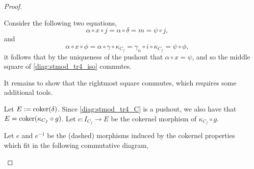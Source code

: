 \begin{proof}
\begin{enumerate}[label={(\bfseries TR\arabic*)}]
{\begin{center}
            \end{center}
            Consider the following two equations,
            \[
                \alpha \circ x \circ j = \alpha \circ \delta = m = \psi \circ j,
            \]
            and
            \[
                \alpha \circ x \circ \phi = \alpha \circ \gamma \circ \kappa_{C_f} = \gamma_n \circ i \circ \kappa_{C_f} = \psi \circ \phi,
            \]
            it follows that by the uniqueness of the pushout that \( \alpha \circ x = \psi \), and so the middle square of \autoref{diag:stmod_tr4_iso} commutes.
            
            It remains to show that the rightmost square commutes, which requires some additional tools.

            Let \( E := \operatorname{coker}(\delta)\). Since \autoref{diag:stmod_tr4_C} is a pushout, we also have that \( E = \operatorname{coker}(\kappa_{C_f} \circ g) \). Let \( c: I_{C_f} \to E \) be the cokernel morphism of \( \kappa_{C_f} \circ g \).

            Let \( e \) and \( e^{-1} \) be the (dashed) morphisms induced by the cokernel properties which fit in the following commutative diagram,
            \begin{center}
\end{center}}
\end{enumerate}
\end{proof}
